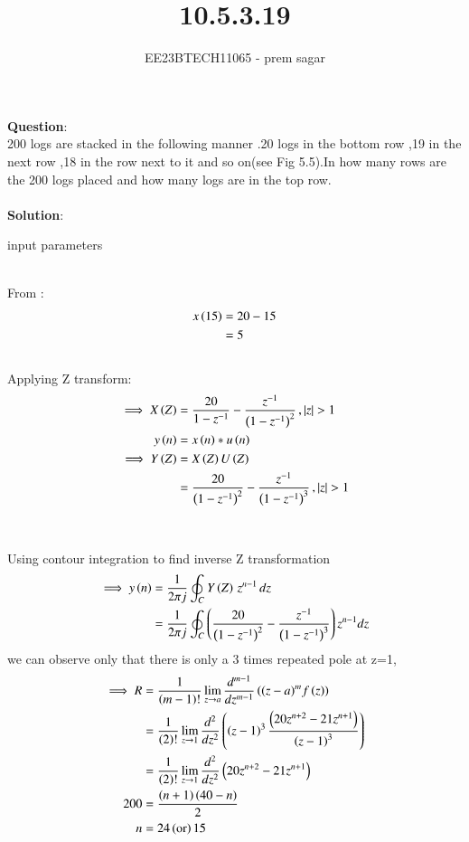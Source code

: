 \documentclass[journal,12pt,twocolumn]{IEEEtran}
\theoremstyle{remark}
\begin{document}

\vspace{3cm}

\title{10.5.3.19}
\author{EE23BTECH11065 - prem sagar}
\maketitle
\newpage

\bigskip 

\renewcommand{\thefigure}{\theenumi}
\renewcommand{\thetable}{\theenumi}
\textbf{Question}:\\ 200 logs are stacked in the following manner .20 logs in the bottom row ,19 in the next row ,18 in the row next to it and so on(see Fig 5.5).In how many rows are the 200 logs placed and how many logs are in the top row.
\\\\\textbf{Solution}:
\begin{table}[!ht]
  \centering
  \renewcommand\thetable{1}
  
  \caption{input parameters}
  \label{tab:10.5.3.19}
  \end{table}
  \\From {}:
\begin{align}
x\left(15\right)&=20-15
\\&=5
\end{align}
\\Applying Z transform:
\begin{align}
\implies X\left(Z\right)&=\frac{20}{1-z^{-1}}-\frac{z^{-1}}{\left(1-z^{-1}\right)^2}\,,\left\vert z\right\vert>1
\\y\left(n\right)&=x\left(n\right)*u\left(n\right)
\\\implies Y\left(Z\right)&=X\left(Z\right)U\left(Z\right)
\\&=\frac{20}{\left(1-z^{-1}\right)^2}-\frac{z^{-1}}{\left(1-z^{-1}\right)^3}\,,\left\vert z\right\vert>1
\end{align}
\\\\Using contour integration to find  inverse Z transformation
\\\begin{align}
\implies y\left(n\right)&=\frac{1}{2\pi j}\oint_{C}Y\left(Z    \right)\,z^{n-1}\,dz
\\&=\frac{1}{2\pi j}\oint_{C}\left(\frac{20}{\left(1-z^{-1}\right)^2}-\frac{z^{-1}}{\left(1-z^{-1}\right)^3}\right)z^{n-1}dz
\end{align}
we can observe only that there is only a 3 times repeated pole at z=1,
\begin{align}
\implies R&=\frac{1}{\left(m-1\right)!}\lim\limits_{z\to a}\frac{d^{m-1}}{dz^{m-1}}\left({(z-a)}^{m}f\left(z\right)\right)
\\&=\frac{1}{\left(2\right)!}\lim\limits_{z\to1}\frac{d^{2}}{dz^{2}}\left(\left(z-1\right)^3\frac{\left(20z^{n+2}-21z^{n+1}\right)}{\left(z-1\right)^3}\right)
\\&=\frac{1}{\left(2\right)!}\lim\limits_{z\to1}\frac{d^{2}}{dz^{2}}\left(20z^{n+2}-21z^{n+1}\right)
\\200&=\frac{\left(n+1\right)\left(40-n\right)}{2}
\\n&=24\left(\text{or}\right)15
\end{align}
\end{document}
